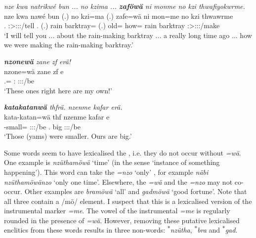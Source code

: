 \begin{exe}
	\ex \emph{nze kwa natrikwé bun ... no kzima ... \textbf{zaföwä} ni monme no kzi thwafiyokwrme.}\\
	\gll nze kwa nawé bun (.) no kzi=ma (.) zafe=wä ni mon=me no kzi thwawrme\\
	\Fsg.\Erg{} \Fut{} \Fsg:\Sbj>\Ssg:\Io:\Nonpast:\Ipfv/tell \Ssg.\Dat{} (.) rain barktray=\Char{} (.) old=\Emph{} \Fnsg{} how=\Ins{} rain barktray \Fnsg:\Sbj>\Stpl:\Obj:\Pst:\Dur/make\\
	\trans `I will tell you ... about the rain-making barktray ... a really long time ago ... how we were making the rain-making barktray.'
	\label{ex471}
\end{exe}
\begin{exe}
	\ex \emph{\textbf{nzonewä} zane zf erä!}\\
	\gll nzone=wä zane zf e\\
	\Fsg.\Poss=\Emph{} \Dem:\Prox{} \Imm{} \Stpl:\Sbj:\Nonpast:\Ipfv/be\\
	\trans `These ones right here are my own!'
	\label{ex472}
\end{exe}
\begin{exe}
	\ex \emph{\textbf{katakatanwä} thfrä. nzenme kafar erä.}\\
	\gll kata-katan=wä thf nzenme kafar e\\
	\Redup-small=\Emph{} \Stpl:\Sbj:\Rpst:\Ipfv/be \Fnsg.\Poss{} big \Stpl:\Sbj:\Nonpast:\Ipfv/be\\
	\trans `Those (yams) were smaller. Ours are big.'
	\label{ex473}
\end{exe}

Some words seem to have lexicalised the  , i.e. they do not occur without \emph{=wä}. One example is \emph{nzüthamöwä} `time' (in the sense `instance of something happening'). This word can take the \emph{=nzo} `only' , for example \emph{näbi nzüthamöwänzo} `only one time'. Elsewhere, the   \emph{=wä} and the   \emph{=nzo} may not co-occur. Other examples are \emph{bramöwä} `all' and \emph{gadmöwä} `good fortune'. Note that all three contain a /mö/ element. I suspect that this is a lexicalised version of the instrumental  marker \emph{=me}. The vowel of the instrumental \emph{=me} is regularly rounded in the presence of \emph{=wä}. However, removing these putative lexicalised enclitics from these words results in three non-words: \textsuperscript{$\ast$}\emph{nzütha}, \textsuperscript{$\ast$}\emph{bra} and \textsuperscript{$\ast$}\emph{gad}.\\
	
